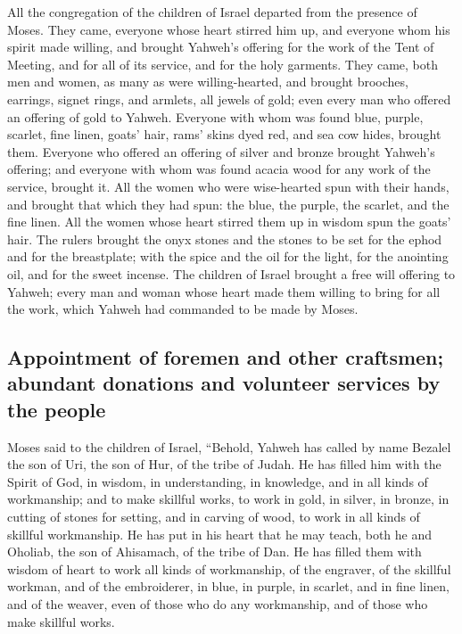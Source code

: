  All the congregation of the children of Israel departed
from the presence of Moses.  They came, everyone whose
heart stirred him up, and everyone whom his spirit made willing, and
brought Yahweh's offering for the work of the Tent of Meeting, and for
all of its service, and for the holy garments.  They
came, both men and women, as many as were willing-hearted, and brought
brooches, earrings, signet rings, and armlets, all jewels of gold; even
every man who offered an offering of gold to Yahweh. 
Everyone with whom was found blue, purple, scarlet, fine linen, goats'
hair, rams' skins dyed red, and sea cow hides, brought them.
 Everyone who offered an offering of silver and bronze
brought Yahweh's offering; and everyone with whom was found acacia wood
for any work of the service, brought it.  All the women
who were wise-hearted spun with their hands, and brought that which they
had spun: the blue, the purple, the scarlet, and the fine linen.
 All the women whose heart stirred them up in wisdom spun
the goats' hair.  The rulers brought the onyx stones and
the stones to be set for the ephod and for the breastplate;
 with the spice and the oil for the light, for the
anointing oil, and for the sweet incense.  The children
of Israel brought a free will offering to Yahweh; every man and woman
whose heart made them willing to bring for all the work, which Yahweh
had commanded to be made by Moses.

\hypertarget{appointment-of-foremen-and-other-craftsmen-abundant-donations-and-volunteer-services-by-the-people}{%
\subsection{Appointment of foremen and other craftsmen; abundant
donations and volunteer services by the
people}\label{appointment-of-foremen-and-other-craftsmen-abundant-donations-and-volunteer-services-by-the-people}}

 Moses said to the children of Israel, ``Behold, Yahweh
has called by name Bezalel the son of Uri, the son of Hur, of the tribe
of Judah.  He has filled him with the Spirit of God, in
wisdom, in understanding, in knowledge, and in all kinds of workmanship;
 and to make skillful works, to work in gold, in silver,
in bronze,  in cutting of stones for setting, and in
carving of wood, to work in all kinds of skillful workmanship.
 He has put in his heart that he may teach, both he and
Oholiab, the son of Ahisamach, of the tribe of Dan.  He
has filled them with wisdom of heart to work all kinds of workmanship,
of the engraver, of the skillful workman, and of the embroiderer, in
blue, in purple, in scarlet, and in fine linen, and of the weaver, even
of those who do any workmanship, and of those who make skillful works.

